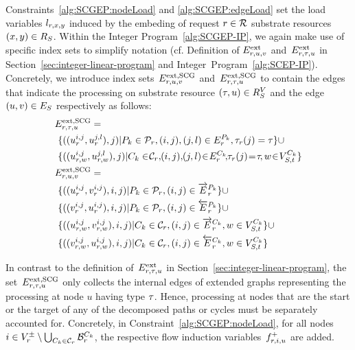 \documentclass[10pt, conference, letterpaper]{IEEEtran}
\begin{document}
Constraints~\ref{alg:SCGEP:nodeLoad} and \ref{alg:SCGEP:edgeLoad} set the load variables $l_{r,x,y}$ induced by the embeding of request $r \in \mathcal{R}$ substrate resources $(x,y) \in  R_{S}$. Within the Integer Program~\ref{alg:SCGEP-IP}, we again make use of specific index sets to simplify notation (cf. Definition of $E^{\textnormal{ext}}_{r,u,v}$ and~$E^{\textnormal{ext}}_{r,\tau,u}$ in Section~\ref{sec:integer-linear-program} and Integer~Program~\ref{alg:SCEP-IP}). Concretely, we introduce index sets~$\VEextCGHorizontal$ and~$\VEextCGVertical$ to contain the edges that indicate the processing on substrate resource $(\tau,u) \in  R^V_{S}$  and the edge $(u,v) \in  E_S$  respectively as follows:
\begin{align*}
& \VEextCGVertical = \\
& ~ \{((u^{i,j}_{\req}, u^{j,l}_{\req}),j) | P_k \in \Paths, (i,j),(j,l) \in \VEpath, \Vtype(j) = \type \} \cup \\
&~ \{((u^{i,j}_{\req,w}, u^{j,l}_{\req,w}),j)| C_k \in \hspace{-2pt} \Cycles, \hspace{-2pt}(i,j),\hspace{-2pt}(j,l) \hspace{-2pt}\in \hspace{-2pt}\VEcycle \hspace{-2pt}, \hspace{-2pt} \Vtype(j)\hspace{-2pt} = \hspace{-2pt}\type \hspace{-2pt}, w \hspace{-2pt}\in \hspace{-2pt} \SVTypesCycle  \} \\
& \VEextCGHorizontal  = \\
&~\{((u^{i,j}_{\req}, v^{i,j}_{\req}), i,j) | P_k \in \Paths,(i,j)\in \VEpathSame\}  \cup\\
&~ \{((v^{i,j}_{\req}, u^{i,j}_{\req}), i,j)| P_k \in \Paths,(i,j)\in \VEpathDiff \}  \cup\\
&~ \{((u^{i,j}_{\req,w}, v^{i,j}_{\req,w}), i,j)| C_k \in \Cycles,(i,j)\in \VEcycleSame, w\in \SVTypesCycle  \} \cup\\
&~ \{((v^{i,j}_{\req,w}, u^{i,j}_{\req,w}), i,j)| C_k \in \Cycles,(i,j)\in \VEcycleDiff, w\in \SVTypesCycle  \}
\end{align*}

In contrast to the definition of~$E^{\textnormal{ext}}_{r,\tau,u}$ in Section~\ref{sec:integer-linear-program}, the set~$\VEextCGVertical$ only collects the internal edges of extended graphs representing the processing at node $u$ having type $\tau$. Hence, processing at nodes that are the start or the target of any of the decomposed paths or cycles must be separately accounted for. Concretely, in Constraint~\ref{alg:SCGEP:nodeLoad}, for all nodes $i \in \VVSourcesTargets \setminus \bigcup_{C_k \in \Cycles} \VVbranchingcycle$, the respective flow induction variables~$\varFlowInput[\req][i][u]$ are added. 
\end{document}
